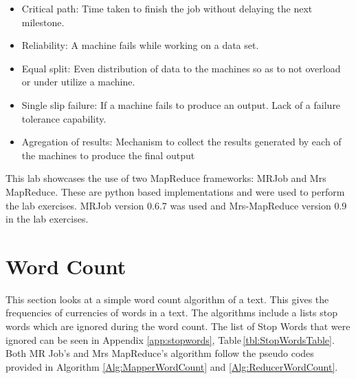 \documentclass[10pt, twocolumn]{article}
\begin{document}
\begin{itemize}
    \item Critical path: Time taken to finish the job without delaying the next milestone.
    \item Reliability: A machine fails while working on a data set.
    \item Equal split: Even distribution of data to the machines so as to not overload or under utilize a machine.
    \item Single slip failure: If a machine fails to produce an output. Lack of a failure tolerance capability. 
    \item Agregation of results: Mechanism to collect the results generated by each of the machines to produce the final output
\end{itemize}

\noindent This lab showcases the use of two MapReduce frameworks:  MRJob and Mrs MapReduce. These are python based implementations and were used to perform the lab exercises. MRJob version 0.6.7 was used and Mrs-MapReduce version 0.9 in the lab exercises.
\section{Word Count}
\label{sec:WordCount}
\noindent This section looks at a simple word count algorithm of a text. This gives the frequencies of currencies of
words in a text. The algorithms include a lists stop words which are ignored during the word count. The list of Stop Words that were ignored can be seen in Appendix \ref*{app:stopwords}, Table\,\ref{tbl:StopWordsTable}. Both MR Job's and Mrs MapReduce's algorithm follow the pseudo codes provided in Algorithm \ref*{Alg:MapperWordCount} and \ref*{Alg:ReducerWordCount}.
\end{document}
